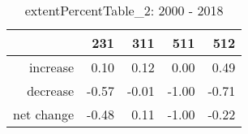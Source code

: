 \begin{table}[ht]
\centering
\begin{tabular}{rrrrr}
  \hline
 & 231 & 311 & 511 & 512 \\ 
  \hline
increase & 0.10 & 0.12 & 0.00 & 0.49 \\ 
  decrease & -0.57 & -0.01 & -1.00 & -0.71 \\ 
  net change & -0.48 & 0.11 & -1.00 & -0.22 \\ 
   \hline
\end{tabular}
\caption{extentPercentTable\_2: 2000 - 2018} 
\end{table}
